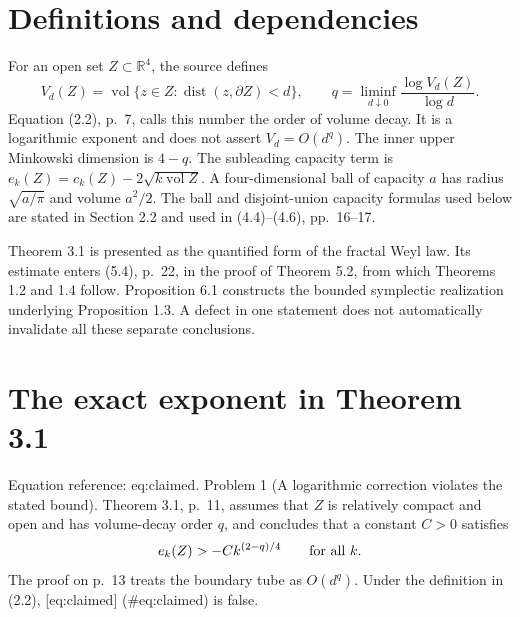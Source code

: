 \documentclass[10pt]{article}
\begin{document}
\section*{Definitions and dependencies}
For an open set \(Z\subset\mathbb R^4\), the source defines \[V_d(Z)=\operatorname{vol}\{z\in Z:\operatorname{dist}(z,\partial Z)<d\},\qquad
 q=\liminf_{d\downarrow0}\frac{\log V_d(Z)}{\log d}.\] Equation (2.2), p. 7, calls this number the order of volume decay. It is a logarithmic exponent and does not assert \(V_d=O(d^q)\). The inner upper Minkowski dimension is \(4-q\). The subleading capacity term is \(e_k(Z)=c_k(Z)-2\sqrt{k\operatorname{vol}Z}\). A four-dimensional ball of capacity \(a\) has radius \(\sqrt{a/\pi}\) and volume \(a^2/2\). The ball and disjoint-union capacity formulas used below are stated in Section 2.2 and used in (4.4)–(4.6), pp. 16–17.\par
Theorem 3.1 is presented as the quantified form of the fractal Weyl law. Its estimate enters (5.4), p. 22, in the proof of Theorem 5.2, from which Theorems 1.2 and 1.4 follow. Proposition 6.1 constructs the bounded symplectic realization underlying Proposition 1.3. A defect in one statement does not automatically invalidate all these separate conclusions.\par
\section*{The exact exponent in Theorem 3.1}
Equation reference: eq:claimed. Problem 1 (A logarithmic correction violates the stated bound).  Theorem 3.1, p. 11, assumes that \(Z\) is relatively compact and open and has volume-decay order \(q\), and concludes that a constant \(C>0\) satisfies \[
 e_k(Z)>-Ck^{(2-q)/4}\qquad\hbox{for all }k.\] The proof on p. 13 treats the boundary tube as \(O(d^q)\). Under the definition in (2.2), [eq:claimed] (\#eq:claimed) is false.\par
\end{document}
